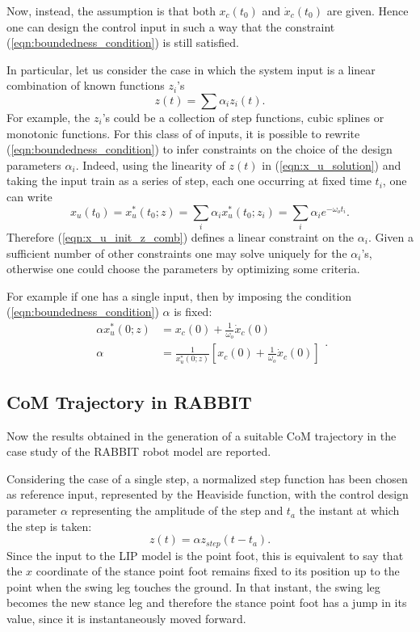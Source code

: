 \documentclass[11pt]{article}
\begin{document}
Now, instead, the assumption is that both $x_c(t_0)$ and $\dot{x}_c(t_0)$ are given. Hence one can design the control input in such a way that the constraint (\ref{eqn:boundedness_condition}) is still satisfied. 

In particular, let us consider the case in which the system input is a linear combination of known functions $z_i$'s
\begin{equation}
\label{eqn:input_comb}
z(t) = \sum{\alpha_iz_i(t)}.
\end{equation}
For example, the $z_i$'s could be a collection of step functions, cubic splines or monotonic functions. For this class of of inputs, it is possible to rewrite (\ref{eqn:boundedness_condition}) to infer constraints on the choice of the design parameters $\alpha_i$. Indeed, using the linearity of $z(t)$ in (\ref{eqn:x_u_solution}) and taking the input train as a series of step, each one occurring at fixed time $t_i$, one can write
\begin{equation}
\label{eqn:x_u_init_z_comb}
x_u(t_0) = x_u^*(t_0;z) = \sum_i{\alpha_ix_u^*(t_0;z_i)} = \sum_i{\alpha_i e^{-\omega_o t_i}}.
\end{equation}
Therefore (\ref{eqn:x_u_init_z_comb}) defines a linear constraint on the $\alpha_i$. Given a sufficient number of other constraints one may solve uniquely for the $\alpha_i$'s, otherwise one could choose the parameters by optimizing some criteria.

For example if one has a single input, then by imposing the condition (\ref{eqn:boundedness_condition}) $\alpha$ is fixed:
\[
\begin{split}
\alpha x_u^*(0;z) & = x_c(0) + \frac{1}{\omega_o}\dot{x}_c(0)\\
\alpha & = \frac{1}{x_u^*(0;z)}[x_c(0) + \frac{1}{\omega_o}\dot{x}_c(0)]
\end{split}.
\]

\subsection{CoM Trajectory in RABBIT}

Now the results obtained in the generation of a suitable CoM trajectory in the case study of the RABBIT robot model are reported.

Considering the case of a single step, a normalized step function has been chosen as reference input, represented by the Heaviside function, with the control design parameter $\alpha$ representing the amplitude of the step and $t_a$ the instant at which the step is taken:
\begin{equation}
\label{eqn:step_funct}
z(t) = \alpha z_{step}(t-t_a).
\end{equation}
Since the input to the LIP model is the point foot, this is equivalent to say that the $x$ coordinate of the stance point foot remains fixed to its position up to the point when the swing leg touches the ground. In that instant, the swing leg becomes the new stance leg and therefore the stance point foot has a jump in its value, since it is instantaneously moved forward.
\end{document}
